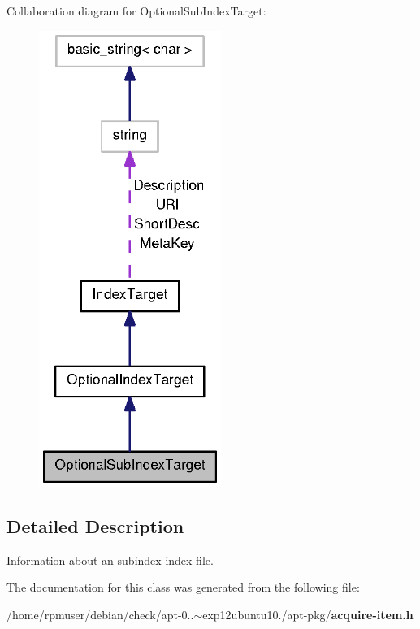 \-Collaboration diagram for \-Optional\-Sub\-Index\-Target\-:
\nopagebreak
\begin{figure}[H]
\begin{center}
\leavevmode
\includegraphics[width=168pt]{classOptionalSubIndexTarget__coll__graph}
\end{center}
\end{figure}


\subsection{\-Detailed \-Description}
\-Information about an subindex index file. 

\-The documentation for this class was generated from the following file\-:\begin{DoxyCompactItemize}
\item 
/home/rpmuser/debian/check/apt-\/0..$\sim$exp12ubuntu10./apt-\/pkg/{\bf acquire-\/item.\-h}\end{DoxyCompactItemize}

